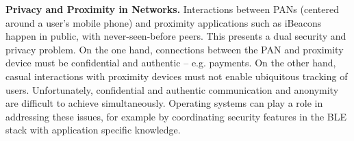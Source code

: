 \smallskip\noindent
\textbf{Privacy and Proximity in Networks.}
Interactions between PANs (centered around a user’s mobile phone)
and proximity applications such as iBeacons happen in public, with
never-seen-before peers. This presents a dual security and privacy problem. On
the one hand, connections between the PAN and proximity device must be
confidential and authentic -- e.g. payments.
On the other hand, casual interactions with
proximity devices must not enable ubiquitous tracking of users. Unfortunately,
confidential and authentic communication and anonymity are difficult to
achieve simultaneously.
%
Operating systems can play a role in addressing these issues, for example by coordinating
security features in the BLE stack with application specific knowledge.

%

